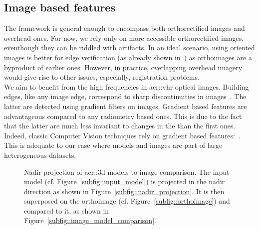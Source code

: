     \subsection{Image based features}
        \label{subsec::learned_evaluation::baseline::image}
        The framework is general enough to encompass both orthorectified images and overhead ones.
        For now, we rely only on more accessible orthorectified images, eventhough they can be riddled with artifacts.
        In an ideal scenario, using oriented images is better for edge verification (as already shown in~\parencite{michelin2013quality}) as orthoimages are a byproduct of earlier ones.
        However, in practice, overlapping overhead imagery would give rise to other issues, especially, registration problems.\\

        We aim to benefit from the high frequencies in \gls{acr::vhr} optical images.
        Building edges, like any image edge, correspond to sharp discontinuities in images~\parencite{ortner2007building}.
        The latter are detected using gradient filters on images.
        Gradient based features are advantageous compared to any radiometry based ones.
        This is due to the fact that the latter are much less invariant to changes in the than the first ones.
        Indeed, classic Computer Vision techniques rely on gradient based features:~\parencite{lowe2004distinctive,dalal2005histograms}.
        This is adequate to our case where models and images are part of large heterogeneous datasets.\\

        \begin{figure}[htb]
            \centering
            
            \caption[
                Nadir projection of \gls{acr::3d} models to image comparison.
            ]{
                \label{fig::nadir_projection}
                Nadir projection of \gls{acr::3d} models to image comparison.
                The input model (cf. Figure~\ref{subfig::input_model}) is projected in the nadir direction as shown in Figure~\ref{subfig::nadir_projection}.
                It is then superposed on the orthoimage (cf. Figure~\ref{subfig::orthoimage}) and compared to it, as shown in Figure~\ref{subfig::image_model_comparison}.
            }
        \end{figure}
        
